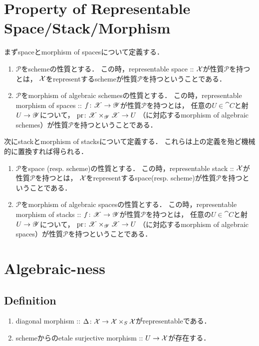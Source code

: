 \documentclass[a4paper, dvipdfmx]{jsarticle}
\newcommand{\Diag}{\Delta}
\begin{document}
\section{Property of Representable Space/Stack/Morphism}
\begin{Def}
    まずspaceとmorphism of spacesについて定義する．
\begin{enumerate}
\item
    $\mathcal{P}$をschemeの性質とする．
    この時，representable space :: $\mathcal{X}$が性質$\mathcal{P}$を持つとは，
    $\mathcal{X}$をrepresentするschemeが性質$\mathcal{P}$を持つということである．

\item
    $\mathcal{P}$をmorphism of algebraic schemesの性質とする．
    この時，representable morphism of spaces :: $f \colon \mathscr{X} \to \mathscr{Y}$が性質$\mathcal{P}$を持つとは，
    任意の$U \in \cat{C}$と射$U \to \mathscr{Y}$について，
    $\operatorname{pr} \colon \mathscr{X} \times_{\mathscr{Y}} \mathscr{X} \to U$
    （に対応するmorphism of algebraic schemes）が性質$\mathcal{P}$を持つということである．
\end{enumerate}

    次にstackとmorphism of stacksについて定義する．
    これらは上の定義を殆ど機械的に置換すれば得られる．
\begin{enumerate}
\item
    $\mathcal{P}$をspace (resp. scheme)の性質とする．
    この時，representable stack :: $\mathcal{X}$が性質$\mathcal{P}$を持つとは，
    $\mathcal{X}$をrepresentするspace(resp. scheme)が性質$\mathcal{P}$を持つということである．

\item
    $\mathcal{P}$をmorphism of algebraic spacesの性質とする．
    この時，representable morphism of stacks :: $f \colon \mathscr{X} \to \mathscr{Y}$が性質$\mathcal{P}$を持つとは，
    任意の$U \in \cat{C}$と射$U \to \mathscr{Y}$について，
    $\operatorname{pr} \colon \mathscr{X} \times_{\mathscr{Y}} \mathscr{X} \to U$
    （に対応するmorphism of algebraic spaces）が性質$\mathcal{P}$を持つということである．
\end{enumerate}
\end{Def}

\section{Algebraic-ness}
\subsection{Definition}
\begin{Def}
    \enumfix
\begin{enumerate}
    \item diagonal morphism :: $\Diag \colon \shX \to \shX \times_{S} \shX$がrepresentableである．
    \item schemeからのetale surjective morphism :: $U \to \mathcal{X}$が存在する．
\end{enumerate}
\end{Def}
\end{document}
